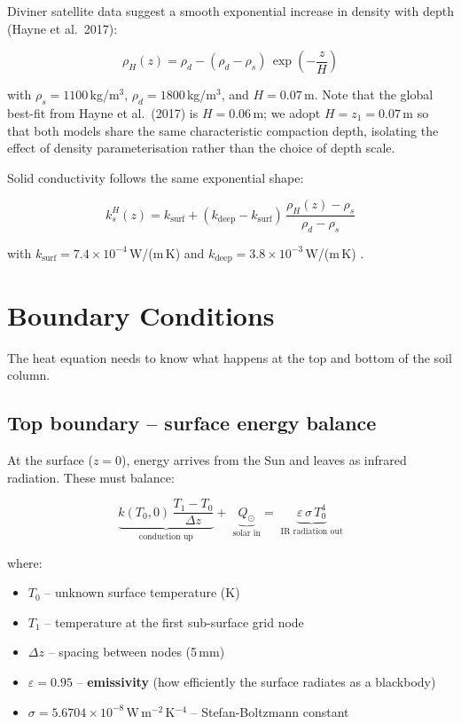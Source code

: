 \documentclass[12pt, a4paper]{article}
\begin{document}
Diviner satellite data suggest a smooth exponential increase
in density with depth (Hayne et al.\ 2017):

\begin{equation}
  \rho_H(z) = \rho_d - (\rho_d - \rho_s)\,
              \exp\!\left(-\frac{z}{H}\right)
  \label{eq:density_hayne}
\end{equation}

with $\rho_s = 1100$\,kg/m$^3$, $\rho_d = 1800$\,kg/m$^3$,
and $H = 0.07$\,m.
Note that the global best-fit from Hayne et al.\ (2017) is $H = 0.06$\,m;
we adopt $H = z_1 = 0.07$\,m so that both models share the same
characteristic compaction depth, isolating the effect of density
parameterisation rather than the choice of depth scale.

Solid conductivity follows the same exponential shape:

\begin{equation}
  k_s^H(z) = k_{\mathrm{surf}}
    + (k_{\mathrm{deep}} - k_{\mathrm{surf}})\,
      \frac{\rho_H(z) - \rho_s}{\rho_d - \rho_s}
  \label{eq:k_hayne}
\end{equation}

with $k_{\mathrm{surf}} = 7.4\times10^{-4}$\,W/(m\,K) and
$k_{\mathrm{deep}} = 3.8\times10^{-3}$\,W/(m\,K) \citep{Hayne2017}.

\section{Boundary Conditions}

The heat equation needs to know what happens at the top and
bottom of the soil column.

\subsection{Top boundary -- surface energy balance}

At the surface ($z = 0$), energy arrives from the Sun and leaves
as infrared radiation.
These must balance:

\begin{equation}
  \underbrace{k(T_0,0)\,\frac{T_1 - T_0}{\Delta z}}_{\text{conduction up}}
  +\;
  \underbrace{Q_{\odot}}_{\text{solar in}}
  =\;
  \underbrace{\varepsilon\,\sigma\,T_0^4}_{\text{IR radiation out}}
  \label{eq:surface_bc}
\end{equation}

where:
\begin{itemize}[leftmargin=1.5em, itemsep=2pt]
  \item $T_0$ -- unknown surface temperature (K)
  \item $T_1$ -- temperature at the first sub-surface grid node
  \item $\Delta z$ -- spacing between nodes (5\,mm)
  \item $\varepsilon = 0.95$ -- \textbf{emissivity} (how efficiently
        the surface radiates as a blackbody)
  \item $\sigma = 5.6704\times10^{-8}$\,W\,m$^{-2}$\,K$^{-4}$ --
        Stefan-Boltzmann constant
\end{itemize}
\end{document}
